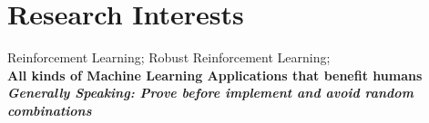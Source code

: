 \section{Research Interests}
    \quad Reinforcement Learning; Robust Reinforcement Learning;
    \\\quad\textbf{All kinds of Machine Learning Applications that benefit humans}\\
    \quad \textit{\textbf{Generally Speaking: Prove before implement and avoid random combinations}}
    
